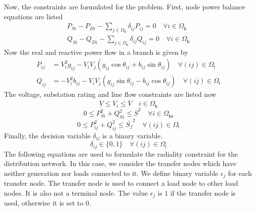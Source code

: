Now, the constraints are formulated for the problem. First, node power balance equations are listed
\begin{equation}
\begin{aligned}
P_{Si}-P_{Di}-\sum_{j\in\mathsf{\Omega_{b}}}{\delta_{ij}P_{ij}}=0\quad\forall i\in\mathsf{\Omega_{b}}\\
Q_{Si}-Q_{Di}-\sum_{j\in\mathsf{\Omega_{b}}}{\delta_{ij}Q_{ij}}=0\quad\forall i\in\mathsf{\Omega_{b}}
\end{aligned}
\label{eq:node-balance}
\end{equation}
Now the real and reactive power flow in a branch is given by
\begin{equation}
\begin{aligned}
	P_{ij}&=V_i^2g_{ij}-V_iV_j(g_{ij}\cos\theta_{ij}+b_{ij}\sin\theta_{ij})\quad\forall (ij)\in\mathsf{\Omega_l}\\
	Q_{ij}&=-V_i^2b_{ij}-V_iV_j(g_{ij}\sin\theta_{ij}-b_{ij}\cos\theta_{ij})\quad\forall (ij)\in\mathsf{\Omega_l}
\end{aligned}
\label{eq:power-flow}
\end{equation}
The voltage, substation rating and line flow constraints are listed now
\begin{equation}
\underline{V}\leq V_i\leq\overline{V}\quad i\in\mathsf{\Omega_b} \label{eq:volt-constraint}
\end{equation}
\begin{equation}
0\leq P_{Si}^2+Q_{Si}^2\leq \overline{S}^2\quad \forall i\in\mathsf{\Omega_{bs}} \label{eq:substation-rating}
\end{equation}
\begin{equation}
0\leq P_{ij}^2+Q_{ij}^2\leq \overline{S_f}^2\quad \forall (ij)\in\mathsf{\Omega_{l}} \label{eq:line-flow}
\end{equation}
Finally, the decision variable $\delta_{ij}$ is a binary variable.
\begin{equation}
\delta_{ij}\in\{0,1\}\quad\forall (ij)\in\mathsf{\Omega_{l}}\label{eq:decision}
\end{equation}
The following equations are used to formulate the radiality constraint for the distribution network. In this case, we consider the transfer nodes which have neither generation nor loads connected to it. We define binary variable $\epsilon_j$ for each transfer node. The transfer node is used to connect a load node to other load nodes. It is also not a terminal node. The value $\epsilon_j$ is $1$ if the transfer node is used, otherwise it is set to $0$.
